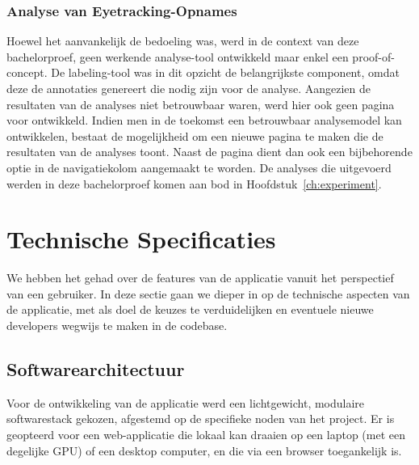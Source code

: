 \subsubsection{Analyse van Eyetracking-Opnames}

Hoewel het aanvankelijk de bedoeling was, werd in de context van deze bachelorproef, geen werkende analyse-tool ontwikkeld maar enkel een proof-of-concept.
De labeling-tool was in dit opzicht de belangrijkste component, omdat deze de annotaties genereert die nodig zijn voor de analyse.
Aangezien de resultaten van de analyses niet betrouwbaar waren, werd hier ook geen pagina voor ontwikkeld.
Indien men in de toekomst een betrouwbaar analysemodel kan ontwikkelen, bestaat de mogelijkheid om een nieuwe pagina te maken die de resultaten van de analyses toont.
Naast de pagina dient dan ook een bijbehorende optie in de navigatiekolom aangemaakt te worden.
De analyses die uitgevoerd werden in deze bachelorproef komen aan bod in Hoofdstuk~\ref{ch:experiment}.

\section{Technische Specificaties}

We hebben het gehad over de features van de applicatie vanuit het perspectief van een gebruiker.
In deze sectie gaan we dieper in op de technische aspecten van de applicatie, 
met als doel de keuzes te verduidelijken en eventuele nieuwe developers wegwijs te maken in de codebase.

\subsection{Softwarearchitectuur}

Voor de ontwikkeling van de applicatie werd een lichtgewicht, modulaire softwarestack gekozen, afgestemd op de specifieke noden van het project.
Er is geopteerd voor een web-applicatie die lokaal kan draaien op een laptop (met een degelijke GPU) of een desktop computer, en die via een browser toegankelijk is.

